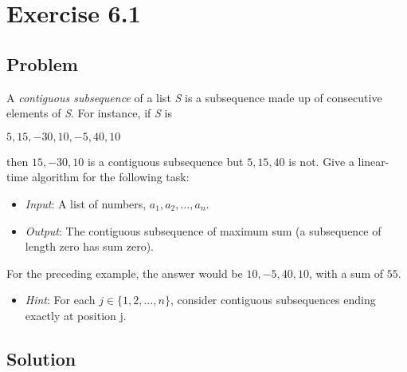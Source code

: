 \documentclass[12pt, letterpaper]{article}
\begin{document}
\section{Exercise 6.1}

\subsection{Problem}

A \textit{contiguous subsequence} of a list \textit{S} is a subsequence made up of consecutive elements of \textit{S}. For instance, if \textit{S} is 
\begin{center}
\(5, 15, -30, 10, -5, 40, 10\)
\end{center}
then \(15, -30, 10\) is a contiguous subsequence but \(5, 15, 40\) is not. Give a linear-time algorithm for the following task:
\begin{center}
\begin{itemize}
    \item[] \textit{Input}: A list of numbers, \({a_1}, {a_2},\dots,{a_n}\).
    \item[] \textit{Output}: The contiguous subsequence of maximum sum (a subsequence of length zero has sum zero).
\end{itemize}
\end{center}
For the preceding example, the answer would be \(10, -5, 40, 10\), with a sum of \(55\).
\begin{center}
\begin{itemize}
    \item[] \textit{Hint}: For each \(j\in\{1,2,\dots,n\}\), consider contiguous subsequences ending exactly at position j.
\end{itemize}
\end{center}

\subsection{Solution}
\end{document}
